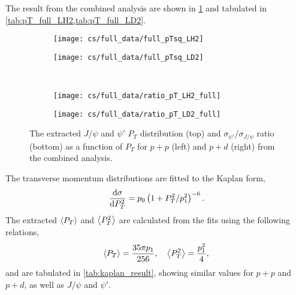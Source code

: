 \documentclass[../main.tex]{subfiles}
\begin{document}
The result from the combined analysis are shown in \cref{fig:pT_combined} and tabulated in \cref{tab:pT_full_LH2,tab:pT_full_LD2}.
\begin{figure}[h!]
	\centering
	\begin{subfigure}{0.45\linewidth}
		\texttt{[image: cs/full\_data/full\_pTsq\_LH2]}
	\end{subfigure}
	\begin{subfigure}{0.45\linewidth}
		\texttt{[image: cs/full\_data/full\_pTsq\_LD2]}
	\end{subfigure}
	\\
	\begin{subfigure}{0.45\linewidth}
		\texttt{[image: cs/full\_data/ratio\_pT\_LH2\_full]}
	\end{subfigure}
	\begin{subfigure}{0.45\linewidth}
		\texttt{[image: cs/full\_data/ratio\_pT\_LD2\_full]}
	\end{subfigure}
	\caption{The extracted $J/\psi$ and $\psi'$ $P_T$ distribution (top) and $\sigma_{\psi'}/\sigma_{J/\psi}$
		ratio (bottom) as a function of $P_T$ for $p+p$ (left) and $p+d$ (right) from
		the combined analysis.}
	\label{fig:pT_combined}
\end{figure}
\begin{table}[h!]
	\centering
	\caption{Cross section $d\sigma/dP^2_T$ (in \unit{\nano\barn\GeV^{-2} nucleon^{-1}}) and the
		$\sigma_{\psi'}/\sigma_{J/\psi}$ ratio for $p+p$ extracted from the combined analysis, with
		their statistical and systematic uncertainties and the $\expval{P_T}$ (in \unit{\GeV}) in each bin.}
	
	\label{tab:pT_full_LH2}
\end{table}
\begin{table}[h!]
	\centering
	\caption{Cross section $d\sigma/dP^2_T$ (in \unit{\nano\barn\GeV^{-2} nucleon^{-1}}) and the
		$\sigma_{\psi'}/\sigma_{J/\psi}$ ratio for $p+d$ extracted from the combined analysis, with
		their statistical and systematic uncertainties and the $\expval{P_T}$ (in \unit{\GeV}) in each bin.}
	
	\label{tab:pT_full_LD2}
\end{table}
The transverse momentum distributions are fitted to the Kaplan form, 
\begin{equation}
	\dv{\sigma}{P_T^2} =p_0 \left(1+ P_T^2/p_1^2\right)^{-6}.
	\label{eq:4_2_kaplan}
\end{equation}
The extracted $\expval{P_T}$ and $\expval{P^2_T}$ are calculated from the fits using the following relations,
\begin{equation}
	\begin{split}
		\expval{P_T} = \frac{35\pi p_1}{256}, \quad \expval{P_T^2} = \frac{p_1^2}{4},
	\end{split}
\end{equation}
and are tabulated in \cref{tab:kaplan_result}, showing similar values for $p+p$ and $p+d$,
as well as $J/\psi$ and $\psi'$.
\end{document}
